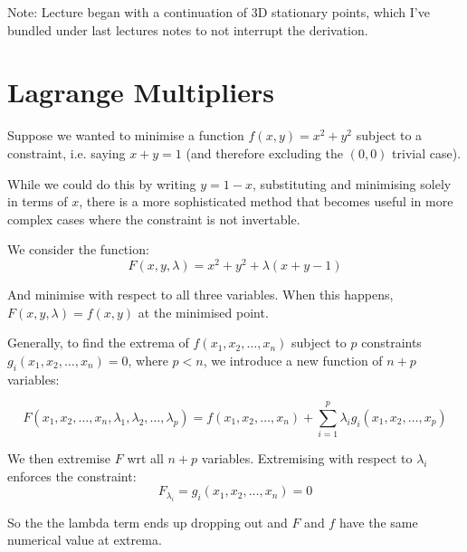 
Note: Lecture began with a continuation of 3D stationary points, which I've bundled under last lectures notes to not interrupt the derivation.


\section{Lagrange Multipliers}
Suppose we wanted to minimise a function $f(x, y) = x^2 + y^2$ subject to a constraint, i.e. saying $x + y = 1$ (and therefore excluding the $(0, 0)$ trivial case).

While we could do this by writing $y = 1-x$, substituting and minimising solely in terms of $x$, there is a more sophisticated method that becomes useful in more complex cases where the constraint is not invertable.

We consider the function:
\[
    F(x, y, \lambda) = x^2 + y^2 + \lambda(x + y - 1)
\]

And minimise with respect to all three variables. When this happens, $F(x, y,\lambda) = f(x, y)$ at the minimised point.

Generally, to find the extrema of $f(x_1, x_2, \ldots, x_n)$ subject to $p$ constraints $g_i(x_1, x_2, \ldots, x_n) = 0$, where $p<n$, we introduce a new function of $n+p$ variables:

\[
    F(x_1, x_2, \ldots, x_n, \lambda_1, \lambda_2, \ldots, \lambda_p) = f(x_1, x_2, \ldots, x_n) + \sum_{i=1}^{p} \lambda_i g_i(x_1, x_2, \ldots, x_p)
\]

We then extremise $F$ wrt all $n+p$ variables. Extremising with respect to $\lambda_i$ enforces the constraint:
\[
    F_{\lambda_i} = g_i(x_1, x_2, \ldots, x_n) = 0
\]

So the the lambda term ends up dropping out and $F$ and $f$ have the same numerical value at extrema.